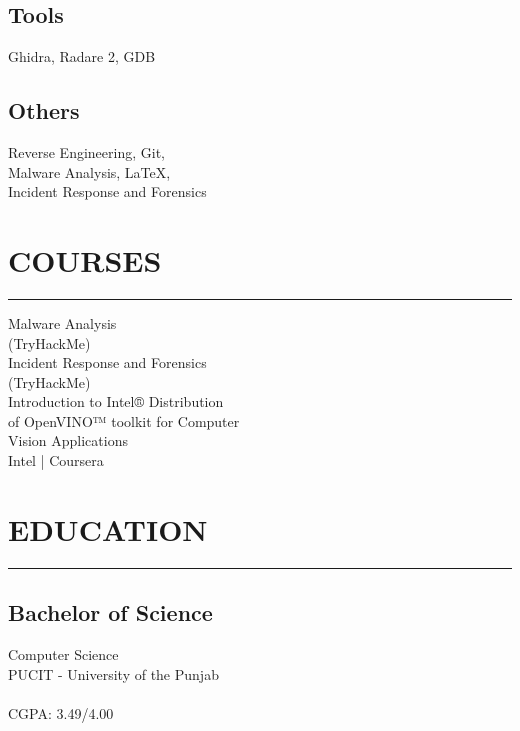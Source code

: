 \documentclass[]{resume}
\begin{document}
\subsection{Tools}
\noindent Ghidra, Radare 2, GDB

\vspace{6pt}
\subsection{Others}
\noindent Reverse Engineering, Git,\\
Malware Analysis, LaTeX,\\
Incident Response and Forensics

%
%

\section{COURSES}
\noindent\rule{5cm}{0.4pt}

\noindent Malware Analysis\\
\noindent (TryHackMe)\\

\noindent Incident Response and Forensics\\
\noindent (TryHackMe)\\

\noindent Introduction to Intel® Distribution\\
of OpenVINO™ toolkit for Computer\\
Vision Applications\\
Intel | Coursera

%
%

\section{EDUCATION}
\noindent\rule{5 cm}{0.4pt}

\subsection{Bachelor of Science}
\noindent Computer Science\\
PUCIT - University of the Punjab\\
\\
CGPA: 3.49/4.00
\end{document}
